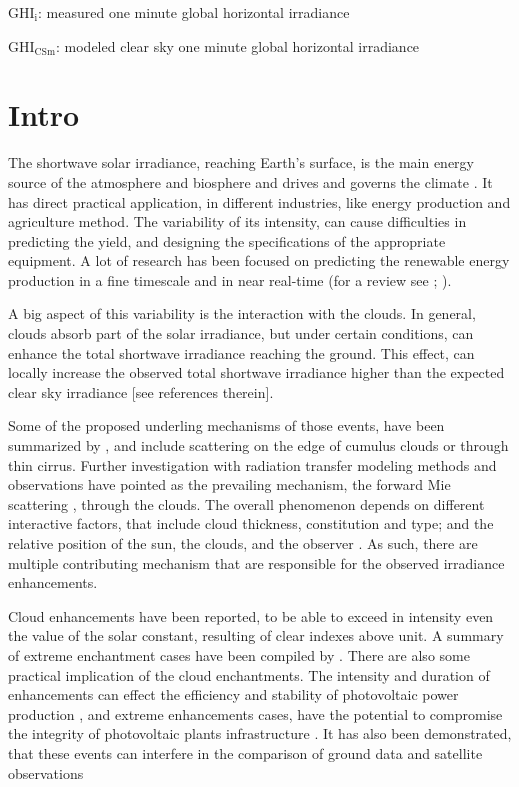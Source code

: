 \documentclass[preprint, 3p,
authoryear]{elsarticle} %
\begin{document}
\(\text{GHI}_\text{i}\): measured one minute global horizontal
irradiance

\(\text{GHI}_\text{CSm}\): modeled clear sky one minute global
horizontal irradiance

\hypertarget{intro}{%
\section{Intro}\label{intro}}

The shortwave solar irradiance, reaching Earth's surface, is the main
energy source of the atmosphere and biosphere and drives and governs the
climate \citep{Gray2010}. It has direct practical application, in
different industries, like energy production and agriculture method. The
variability of its intensity, can cause difficulties in predicting the
yield, and designing the specifications of the appropriate equipment. A
lot of research has been focused on predicting the renewable energy
production in a fine timescale and in near real-time (for a review see
\citet{Inman2013}; \citet{Graabak2016}).

A big aspect of this variability is the interaction with the clouds. In
general, clouds absorb part of the solar irradiance, but under certain
conditions, can enhance the total shortwave irradiance reaching the
ground. This effect, can locally increase the observed total shortwave
irradiance higher than the expected clear sky irradiance {[}see
references therein{]}.

Some of the proposed underling mechanisms of those events, have been
summarized by \citet{Gueymard2017}, and include scattering on the edge
of cumulus clouds or through thin cirrus. Further investigation with
radiation transfer modeling methods and observations have pointed as the
prevailing mechanism, the forward Mie scattering
\citep{Pecenak2016, Thuillier2013, Yordanov2013, Yordanov2015}, through
the clouds. The overall phenomenon depends on different interactive
factors, that include cloud thickness, constitution and type; and the
relative position of the sun, the clouds, and the observer
\citep{Gueymard2017, Veerman2022}. As such, there are multiple
contributing mechanism that are responsible for the observed irradiance
enhancements.

Cloud enhancements have been reported, to be able to exceed in intensity
even the value of the solar constant, resulting of clear indexes above
unit. A summary of extreme enchantment cases have been compiled by
\citet{Martins2022}. There are also some practical implication of the
cloud enchantments. The intensity and duration of enhancements can
effect the efficiency and stability of photovoltaic power production
\citep{Lappalainen2020, Jaervelae2020}, and extreme enhancements cases,
have the potential to compromise the integrity of photovoltaic plants
infrastructure \citep{DoNascimento2019}. It has also been demonstrated,
that these events can interfere in the comparison of ground data and
satellite observations \citep{Damiani2018}
\end{document}
